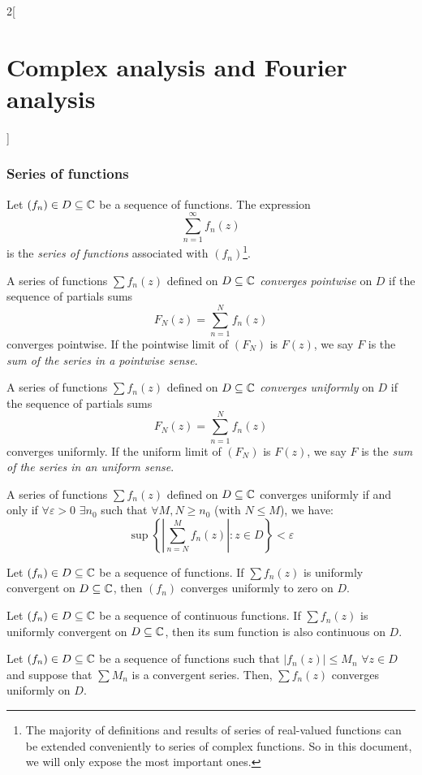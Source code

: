 \documentclass[../../../main.tex]{subfiles}
\begin{document}
\begin{multicols}{2}[\section{Complex analysis and Fourier analysis}]
  \subsubsection{Series of functions}
  \begin{definition}
    Let $(f_n)\in D\subseteq\mathbb{C}$ be a sequence of functions. The expression $$\sum_{n=1}^\infty f_n(z)$$ is the \emph{series of functions} associated with $(f_n)$\footnote{The majority of definitions and results of series of real-valued functions can be extended conveniently to series of complex functions. So in this document, we will only expose the most important ones.}.
  \end{definition}
  \begin{definition}
    A series of functions $\sum f_n(z)$ defined on $D\subseteq\mathbb{C}$ \emph{converges pointwise} on $D$ if the sequence of partials sums $$F_N(z)=\sum_{n=1}^Nf_n(z)$$ converges pointwise. If the pointwise limit of $(F_N)$ is $F(z)$, we say $F$ is the \emph{sum of the series in a pointwise sense}.
  \end{definition}
  \begin{definition}
    A series of functions $\sum f_n(z)$ defined on $D\subseteq\mathbb{C}$ \emph{converges uniformly} on $D$ if the sequence of partials sums $$F_N(z)=\sum_{n=1}^Nf_n(z)$$ converges uniformly. If the uniform limit of $(F_N)$ is $F(z)$, we say $F$ is the \emph{sum of the series in an uniform sense}.
  \end{definition}
  \begin{theorem}
    A series of functions $\sum f_n(z)$ defined on $D\subseteq\mathbb{C}$ converges uniformly if and only if $\forall\varepsilon>0$ $\exists n_0$ such that $\forall  M, N\geq n_0$ (with $N\leq M$), we have: $$\sup\left\{\left|\sum_{n=N}^Mf_n(z)\right|:z\in D\right\}< \varepsilon$$
  \end{theorem}
  \begin{corollary}
    Let $(f_n)\in D\subseteq\mathbb{C}$ be a sequence of functions. If $\sum f_n(z)$ is uniformly convergent on $D\subseteq\mathbb{C}$, then $(f_n)$ converges uniformly to zero on $D$.
  \end{corollary}
  \begin{theorem}
    Let $(f_n)\in D\subseteq\mathbb{C}$ be a sequence of continuous functions. If $\sum f_n(z)$ is uniformly convergent on $D\subseteq\mathbb{C}$, then its sum function is also continuous on $D$.
  \end{theorem}
  \begin{theorem}
    Let $(f_n)\in D\subseteq\mathbb{C}$ be a sequence of functions such that $|f_n(z)|\leq M_n$ $\forall z\in D$ and suppose that $\sum M_n$ is a convergent series. Then, $\sum f_n(z)$ converges uniformly on $D$.
  \end{theorem}

\end{multicols}
\end{document}
